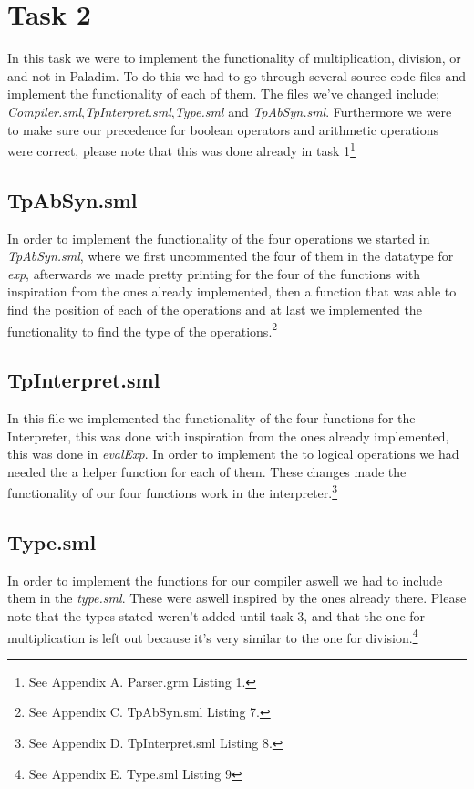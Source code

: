 \documentclass[12pt,a4paper,english]{article}
\begin{document}
\section{Task 2}
In this task we were to implement the functionality of multiplication, division, or and not in Paladim. To do this we had to go through several source code files and implement the functionality of each of them. The files we've changed include; \textit{Compiler.sml},\textit{TpInterpret.sml},\textit{Type.sml} and \textit{TpAbSyn.sml}. Furthermore we were to make sure our precedence for boolean operators and arithmetic operations were correct, please note that this was done already in task 1\footnote{See Appendix A. Parser.grm Listing 1.}
\subsection{TpAbSyn.sml}
In order to implement the functionality of the four operations we started in \textit{TpAbSyn.sml}, where we first uncommented the four of them in the datatype for \textit{exp}, afterwards we made pretty printing for the four of the functions with inspiration from the ones already implemented, then a function that was able to find the position of each of the operations and at last we implemented the functionality to find the type of the operations.\footnote{See Appendix C. TpAbSyn.sml Listing 7.}
\subsection{TpInterpret.sml}
In this file we implemented the functionality of the four functions for the Interpreter, this was done with inspiration from the ones already implemented, this was done in \textit{evalExp}. In order to implement the to logical operations we had needed the a helper function for each of them. These changes made the functionality of our four functions work in the interpreter.\footnote{See Appendix D. TpInterpret.sml Listing 8.}
\subsection{Type.sml}
In order to implement the functions for our compiler aswell we had to include them in the \textit{type.sml}. These were aswell inspired by the ones already there. Please note that the types stated weren't added until task 3, and that the one for multiplication is left out because it's very similar to the one for division.\footnote{See Appendix E. Type.sml Listing 9}
\end{document}
